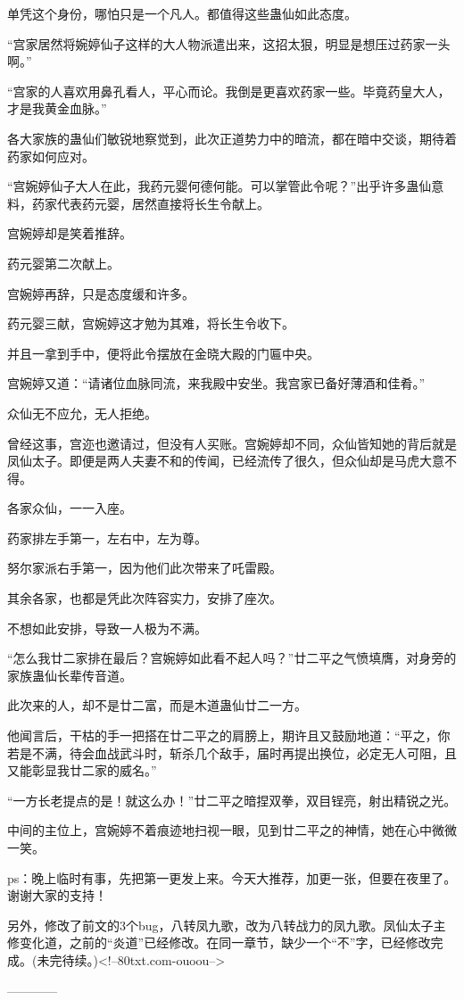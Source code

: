 \begin{this_body}
单凭这个身份，哪怕只是一个凡人。都值得这些蛊仙如此态度。

“宫家居然将婉婷仙子这样的大人物派遣出来，这招太狠，明显是想压过药家一头啊。”

“宫家的人喜欢用鼻孔看人，平心而论。我倒是更喜欢药家一些。毕竟药皇大人，才是我黄金血脉。”

各大家族的蛊仙们敏锐地察觉到，此次正道势力中的暗流，都在暗中交谈，期待着药家如何应对。

“宫婉婷仙子大人在此，我药元婴何德何能。可以掌管此令呢？”出乎许多蛊仙意料，药家代表药元婴，居然直接将长生令献上。

宫婉婷却是笑着推辞。

药元婴第二次献上。

宫婉婷再辞，只是态度缓和许多。

药元婴三献，宫婉婷这才勉为其难，将长生令收下。

并且一拿到手中，便将此令摆放在金晓大殿的门匾中央。

宫婉婷又道：“请诸位血脉同流，来我殿中安坐。我宫家已备好薄酒和佳肴。”

众仙无不应允，无人拒绝。

曾经这事，宫迩也邀请过，但没有人买账。宫婉婷却不同，众仙皆知她的背后就是凤仙太子。即便是两人夫妻不和的传闻，已经流传了很久，但众仙却是马虎大意不得。

各家众仙，一一入座。

药家排左手第一，左右中，左为尊。

努尔家派右手第一，因为他们此次带来了吒雷殿。

其余各家，也都是凭此次阵容实力，安排了座次。

不想如此安排，导致一人极为不满。

“怎么我廿二家排在最后？宫婉婷如此看不起人吗？”廿二平之气愤填膺，对身旁的家族蛊仙长辈传音道。

此次来的人，却不是廿二富，而是木道蛊仙廿二一方。

他闻言后，干枯的手一把搭在廿二平之的肩膀上，期许且又鼓励地道：“平之，你若是不满，待会血战武斗时，斩杀几个敌手，届时再提出换位，必定无人可阻，且又能彰显我廿二家的威名。”

“一方长老提点的是！就这么办！”廿二平之暗捏双拳，双目锃亮，射出精锐之光。

中间的主位上，宫婉婷不着痕迹地扫视一眼，见到廿二平之的神情，她在心中微微一笑。

ps：晚上临时有事，先把第一更发上来。今天大推荐，加更一张，但要在夜里了。谢谢大家的支持！

另外，修改了前文的3个bug，八转凤九歌，改为八转战力的凤九歌。凤仙太子主修变化道，之前的“炎道”已经修改。在同一章节，缺少一个“不”字，已经修改完成。(未完待续。)<!--80txt.com-ouoou-->

------------

\end{this_body}

